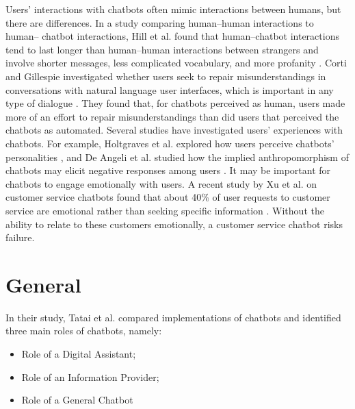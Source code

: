 


Users' interactions with chatbots often mimic interactions between humans, but there are differences. In a study comparing human–human interactions to human– chatbot interactions, Hill et al. found that human–chatbot interactions tend to last longer than human–human interactions between strangers and involve shorter messages, less complicated vocabulary, and more profanity \cite{hill2015}.
Corti and Gillespie investigated whether users seek to repair misunderstandings in conversations with natural language user interfaces, which is important in any type of dialogue \cite{corti2016}. They found that, for chatbots perceived as human, users made more of an effort to repair misunderstandings than did users that perceived the chatbots as automated.
Several studies have investigated users’ experiences with chatbots. For example, Holtgraves et al. explored how users perceive chatbots’ personalities \cite{holtgraves2007}, and De Angeli et al. studied how the implied anthropomorphism of chatbots may elicit negative responses among users \cite{deangeli2001}. It may be important for chatbots to engage emotionally with users. A recent study by Xu et al. on customer service chatbots found that about 40\% of user requests to customer service are emotional rather than seeking specific information \cite{xu2017}. Without the ability to relate to these customers emotionally, a customer service chatbot risks failure.

\section {General} %

In their study, Tatai et al. \cite{tatai2003} compared implementations of chatbots and identified three main roles of chatbots, namely:

\begin{itemize}
\item Role of a Digital Assistant;
\item Role of an Information Provider;
\item Role of a General Chatbot
\end{itemize}


